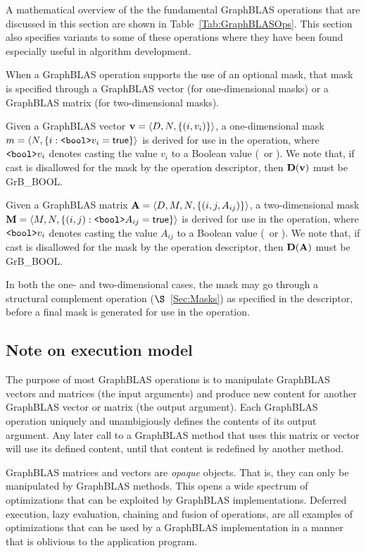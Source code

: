 A mathematical overview of the the fundamental GraphBLAS operations that are
discussed in this section are shown in Table~\ref{Tab:GraphBLASOps}.  This
section also specifies variants to some of these operations where they have
been found especially useful in algorithm development.

When a GraphBLAS operation supports the use of an optional mask, that mask is
specified through a GraphBLAS vector (for one-dimensional masks) or
a GraphBLAS matrix (for two-dimensional masks).

Given a GraphBLAS vector ${\bf v} = \langle D,N, \{ (i,v_i) \} \rangle$, a
one-dimensional mask $m = \langle N, \{ i : \mbox{\tt <bool>}v_i = {\sf true} \} \rangle$
is derived for use in the operation, where $\mbox{\tt <bool>}v_i$ denotes
casting the value $v_i$ to a Boolean value (\true\ or \false).
We note that, if cast is disallowed for the mask by the operation descriptor, then
$\bold{D}({\bf v})$ must be {\sf GrB\_BOOL}.

Given a GraphBLAS matrix ${\bf A} = \langle D, M, N, \{ (i,j,A_{ij}) \} \rangle$,
a two-dimensional mask ${\bf M} = \langle M,N, \{ (i,j) : \mbox{\tt <bool>}A_{ij} = {\sf true} \} \rangle$
is derived for use in the operation, where $\mbox{\tt <bool>}v_i$ denotes
casting the value $A_{ij}$ to a Boolean value (\true\ or \false).
We note that, if cast is disallowed for the mask by the operation descriptor, then
$\bold{D}({\bf A})$ must be {\sf GrB\_BOOL}.

In both the one- and two-dimensional cases, the mask may go through a structural
complement operation ($\S$~\ref{Sec:Masks}) as specified in the descriptor, before a final
mask is generated for use in the operation.

\subsection{Note on execution model}

The purpose of most GraphBLAS operations is to manipulate GraphBLAS vectors and matrices
(the input arguments) and produce new content for another GraphBLAS vector or matrix (the output argument).
Each GraphBLAS operation uniquely and unambigiously defines the contents of its output argument.
Any later call to a GraphBLAS method that uses this matrix or vector will use its defined content, until
that content is redefined by another method.

GraphBLAS matrices and vectors are \emph{opaque} objects. That is, they can only be manipulated
by GraphBLAS methods. This opens a wide spectrum of optimizations that can be exploited by GraphBLAS implementations.
Deferred execution, lazy evaluation, chaining and fusion of operations, are all examples of optimizations
that can be used by a GraphBLAS implementation in a manner that is oblivious to the application program.

